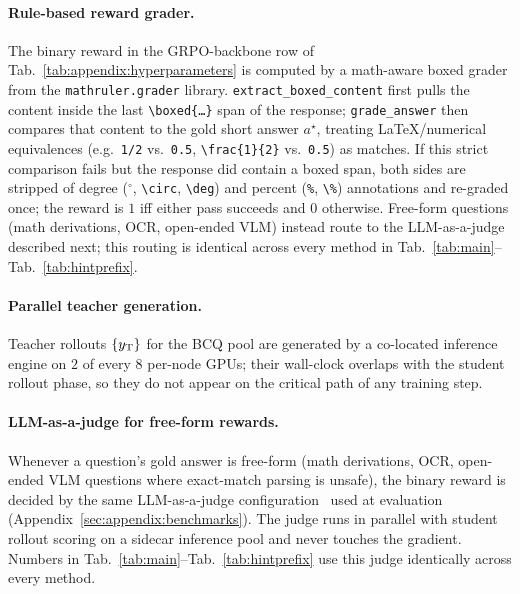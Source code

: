 \paragraph{Rule-based reward grader.}
The binary reward in the GRPO-backbone row of Tab.~\ref{tab:appendix:hyperparameters} is computed by a math-aware boxed grader from the \texttt{mathruler.grader} library. \texttt{extract\_boxed\_content} first pulls the content inside the last \texttt{\textbackslash boxed\{\dots\}} span of the response; \texttt{grade\_answer} then compares that content to the gold short answer $a^{\star}$, treating LaTeX/numerical equivalences (e.g.\ \texttt{1/2} vs.\ \texttt{0.5}, \texttt{\textbackslash frac\{1\}\{2\}} vs.\ \texttt{0.5}) as matches. If this strict comparison fails but the response did contain a boxed span, both sides are stripped of degree (${}^{\circ}$, \texttt{\textbackslash circ}, \texttt{\textbackslash deg}) and percent (\texttt{\%}, \texttt{\textbackslash \%}) annotations and re-graded once; the reward is $1$ iff either pass succeeds and $0$ otherwise. Free-form questions (math derivations, OCR, open-ended VLM) instead route to the LLM-as-a-judge described next; this routing is identical across every method in Tab.~\ref{tab:main}--Tab.~\ref{tab:hintprefix}.

\paragraph{Parallel teacher generation.}
Teacher rollouts $\{y_{\rm T}\}$ for the BCQ pool are generated by a co-located inference engine on $2$ of every $8$ per-node GPUs; their wall-clock overlaps with the student rollout phase, so they do not appear on the critical path of any training step.

\paragraph{LLM-as-a-judge for free-form rewards.}
Whenever a question's gold answer is free-form (math derivations, OCR, open-ended VLM questions where exact-match parsing is unsafe), the binary reward is decided by the same LLM-as-a-judge configuration~\citep{zheng2023judging} used at evaluation (Appendix~\ref{sec:appendix:benchmarks}). The judge runs in parallel with student rollout scoring on a sidecar inference pool and never touches the gradient. Numbers in Tab.~\ref{tab:main}--Tab.~\ref{tab:hintprefix} use this judge identically across every method.

